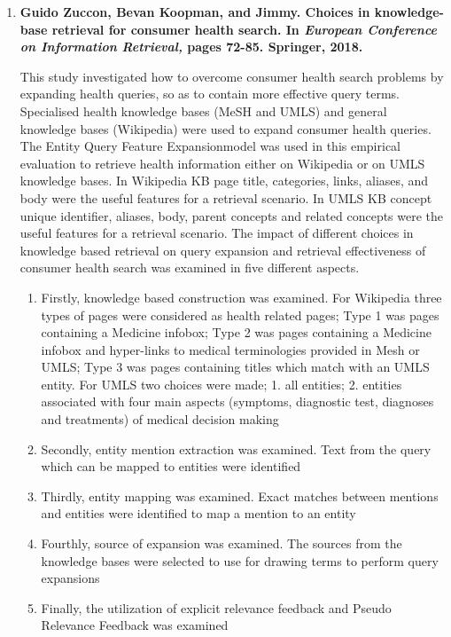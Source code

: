\documentclass[]{article}
\begin{document}
\begin{enumerate}
\item {\textbf{Guido Zuccon, Bevan Koopman, and Jimmy. Choices in knowledge-base retrieval for consumer health search. In \textit{European Conference on Information Retrieval,} pages 72-85. Springer, 2018.}}  

This study investigated how to overcome consumer health search problems by expanding health queries, so as to contain more effective query terms. Specialised health knowledge bases (MeSH and UMLS) and general knowledge bases (Wikipedia) were used to 
expand consumer health queries. The \textquotesingle Entity Query Feature Expansion\textquotesingle model was used in this empirical evaluation to retrieve health information either on Wikipedia or on UMLS knowledge bases. In Wikipedia KB page title, categories, links, aliases, and body were the useful features for a retrieval scenario. In UMLS KB concept unique identifier, aliases, body, parent concepts and related concepts were the useful features for a retrieval scenario. The impact of different choices in knowledge based retrieval on query expansion and retrieval effectiveness of consumer health search was examined in five different aspects. 

\begin{enumerate}
	\item Firstly, knowledge based construction was examined. For Wikipedia three types of pages were considered as health related pages; Type 1 was pages containing a Medicine infobox; Type 2 was pages containing a Medicine infobox and hyper-links to medical terminologies provided in Mesh or UMLS; Type 3 was pages containing titles which match with an UMLS entity. For UMLS two choices were made; 1. all entities; 2. entities associated with four main aspects (symptoms, diagnostic test, diagnoses and treatments) of medical decision making
	
	\item Secondly, entity mention extraction was examined. Text from the query which can be mapped to entities were identified
	
	\item Thirdly, entity mapping was examined. Exact matches between mentions and entities were identified to map a mention to an entity
	
	\item Fourthly, source of expansion was examined. The sources from the knowledge bases were selected to use for drawing terms to perform query expansions
	
	\item Finally, the utilization of explicit relevance feedback and Pseudo Relevance Feedback was examined 
	

\end{enumerate}
\end{enumerate}
\end{document}
